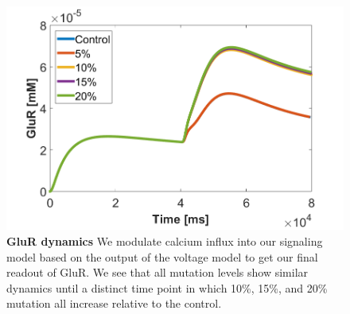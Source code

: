 \begin{figure}[!!h]
    \centering
    \includegraphics[width=1\textwidth]{images/GluRTimeSomaStim.png}
    \caption{\textbf{GluR dynamics} We modulate calcium influx into our signaling model based on the output of the voltage model to get our final readout of GluR. We see that all mutation levels show similar dynamics until a distinct time point in which 10\%, 15\%, and 20\% mutation all increase relative to the control.}
    \label{GluR}
\end{figure}

